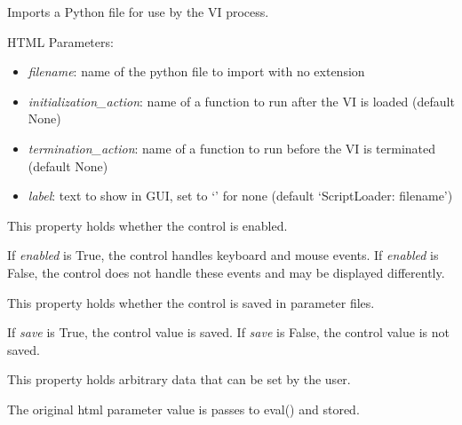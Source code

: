 \documentclass[letterpaper,10pt,english]{sphinxmanual}
\begin{document}
\begin{fulllineitems}
\label{api:controls.ScriptLoader}
Imports a Python file for use by the VI process.

HTML Parameters:
\begin{itemize}
\item {} 
\emph{filename}: name of the python file to import with no extension

\item {} 
\emph{initialization\_action}: name of a function to run after the VI is loaded (default None)

\item {} 
\emph{termination\_action}: name of a function to run before the VI is terminated (default None)

\item {} 
\emph{label}: text to show in GUI, set to `' for none (default `ScriptLoader: filename')

\end{itemize}

\begin{fulllineitems}
\label{api:controls.ScriptLoader.enabled}
This property holds whether the control is enabled.

If \emph{enabled} is True, the control handles keyboard and mouse events.
If \emph{enabled} is False, the control does not handle these events and may
be displayed differently.

\end{fulllineitems}


\begin{fulllineitems}
\label{api:controls.ScriptLoader.save}
This property holds whether the control is saved in parameter files.

If \emph{save} is True, the control value is saved.
If \emph{save} is False, the control value is not saved.

\end{fulllineitems}


\begin{fulllineitems}
\label{api:controls.ScriptLoader.user}
This property holds arbitrary data that can be set by the user.

The original html parameter value is passes to eval() and stored.

\end{fulllineitems}


\end{fulllineitems}
\end{document}

